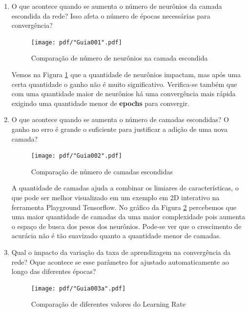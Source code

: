 \begin{enumerate}
    \item O que acontece quando se aumenta o número de neurônios da camada escondida da rede? Isso afeta o
    número de épocas necessárias para convergência?
    
    \begin{figure}[H]
        \centering
        \texttt{[image: pdf/"Guia001".pdf]}
        \caption{Comparação de número de neurônios na camada escondida}
        \label{fig:compneurohidden}
    \end{figure}
    
    Vemos na Figura \ref{fig:compneurohidden} que a quantidade de neurônios impactam, mas após uma certa quantidade o ganho não é muito significativo. Verifica-se também que com uma quantidade maior de neurônios há uma convergência mais rápida exigindo uma quantidade menor de \textbf{epochs} para convergir.
    
    \newpage
    \item O que acontece quando se aumenta o número de camadas escondidas? O ganho no erro é grande o suficiente para justificar a adição de uma nova camada?
    
    \begin{figure}[H]
        \centering
        \texttt{[image: pdf/"Guia002".pdf]}
        \caption{Comparação de número de camadas escondidas}
        \label{fig:complayerhidden}
    \end{figure}
    
    A quantidade de camadas ajuda a combinar os limiares de características, o que pode ser melhor visualizado em um exemplo em 2D interativo na ferramenta Playground Tensorflow\cite{ANeuralN47:online}. No gráfico da Figura \ref{fig:complayerhidden} percebemos que uma maior quantidade de camadas da uma maior complexidade pois aumenta o espaço de busca dos pesos dos neurônios. Pode-se ver que o crescimento de acurácia não é tão suavizado quanto a quantidade menor de camadas.
    
    \newpage
    \item Qual o impacto da variação da taxa de aprendizagem na convergência da rede? Oque acontece se esse parâmetro for ajustado automaticamente ao longo das diferentes épocas?
    
    \begin{figure}[H]
        \centering
        \texttt{[image: pdf/"Guia003a".pdf]}
        \caption{Comparação de diferentes valores do Learning Rate}
        \label{fig:variationlr}
    \end{figure}
    

\end{enumerate}

